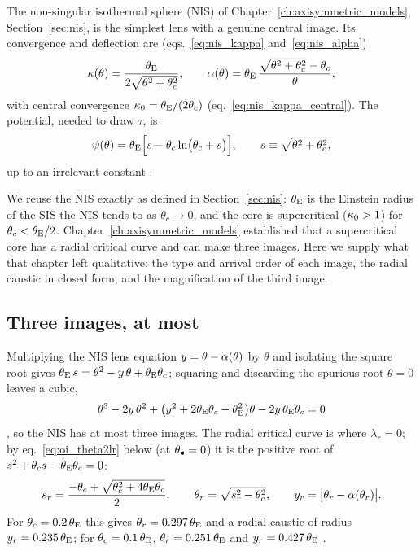 The non-singular isothermal sphere (NIS) of
Chapter~\ref{ch:axisymmetric_models}, Section~\ref{sec:nis}, is the
simplest lens with a genuine central image.  Its convergence and
deflection are (eqs.~\ref{eq:nis_kappa} and~\ref{eq:nis_alpha})
\begin{equation}
    \kappa(\theta) = \frac{\theta_{\mathrm{E}}}{2\sqrt{\theta^2+\theta_c^2}}, \qquad
    \alpha(\theta) = \theta_{\mathrm{E}}\,\frac{\sqrt{\theta^2+\theta_c^2}-\theta_c}{\theta},
    \label{eq:oi_nis}
\end{equation}
with central convergence $\kappa_0=\theta_{\mathrm{E}}/(2\theta_c)$
(eq.~\ref{eq:nis_kappa_central}).  The potential, needed to draw $\tau$,
is
\begin{equation}
    \psi(\theta) = \theta_{\mathrm{E}}\Big[s - \theta_c\ln\!\big(\theta_c + s\big)\Big],
    \qquad s\equiv\sqrt{\theta^2+\theta_c^2},
    \label{eq:oi_psi_nis}
\end{equation}
up to an irrelevant constant .

\begin{bridge}
We reuse the NIS exactly as defined in Section~\ref{sec:nis}: $\theta_{\mathrm{E}}$
is the Einstein radius of the SIS the NIS tends to as $\theta_c\to0$,
and the core is supercritical ($\kappa_0>1$) for $\theta_c<\theta_{\mathrm{E}}/2$.
Chapter~\ref{ch:axisymmetric_models} established that a supercritical
core has a radial critical curve and can make three images.  Here we
supply what that chapter left qualitative: the type and arrival order
of each image, the radial caustic in closed form, and the magnification
of the third image.
\end{bridge}

\subsection{Three images, at most}

Multiplying the NIS lens equation $y=\theta-\alpha(\theta)$ by
$\theta$ and isolating the square root gives
$\theta_{\mathrm{E}}\,s=\theta^2-y\,\theta+\theta_{\mathrm{E}}\theta_c$; squaring and
discarding the spurious root $\theta=0$ leaves a cubic,
\begin{equation}
    \theta^3 - 2y\,\theta^2 + \big(y^2 + 2\theta_{\mathrm{E}}\theta_c - \theta_{\mathrm{E}}^2\big)\theta
    - 2y\,\theta_{\mathrm{E}}\theta_c = 0
    \label{eq:oi_nis_cubic}
\end{equation}
, so the NIS has at most three images.  The radial
critical curve is where $\lambda_r=0$; by eq.~\eqref{eq:oi_theta2lr}
below (at $\theta_{\bullet}=0$) it is the positive root of
$s^2+\theta_c s-\theta_{\mathrm{E}}\theta_c=0$:
\begin{equation}
    s_r = \frac{-\theta_c+\sqrt{\theta_c^2+4\theta_{\mathrm{E}}\theta_c}}{2}, \qquad
    \theta_r = \sqrt{s_r^2-\theta_c^2}, \qquad
    y_r = \big|\theta_r - \alpha(\theta_r)\big| .
    \label{eq:oi_nis_radial}
\end{equation}
For $\theta_c=0.2\,\theta_{\mathrm{E}}$ this gives $\theta_r=0.297\,\theta_{\mathrm{E}}$ and a
radial caustic of radius $y_r=0.235\,\theta_{\mathrm{E}}$; for
$\theta_c=0.1\,\theta_{\mathrm{E}}$, $\theta_r=0.251\,\theta_{\mathrm{E}}$ and
$y_r=0.427\,\theta_{\mathrm{E}}$ .

